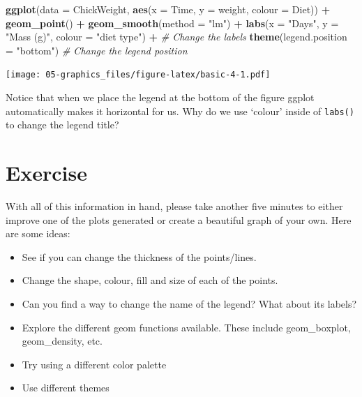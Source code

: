 \documentclass[
]{book}
\newenvironment{Shaded}{\begin{snugshade}}{\end{snugshade}}
\newcommand{\CommentTok}[1]{\textcolor[rgb]{0.56,0.35,0.01}{\textit{#1}}}
\newcommand{\DataTypeTok}[1]{\textcolor[rgb]{0.13,0.29,0.53}{#1}}
\newcommand{\KeywordTok}[1]{\textcolor[rgb]{0.13,0.29,0.53}{\textbf{#1}}}
\newcommand{\NormalTok}[1]{#1}
\newcommand{\OperatorTok}[1]{\textcolor[rgb]{0.81,0.36,0.00}{\textbf{#1}}}
\newcommand{\StringTok}[1]{\textcolor[rgb]{0.31,0.60,0.02}{#1}}
\providecommand{\tightlist}{%
  \setlength{\itemsep}{0pt}\setlength{\parskip}{0pt}}
\begin{document}
\begin{Shaded}
\begin{Highlighting}[]
\KeywordTok{ggplot}\NormalTok{(}\DataTypeTok{data =}\NormalTok{ ChickWeight, }\KeywordTok{aes}\NormalTok{(}\DataTypeTok{x =}\NormalTok{ Time, }\DataTypeTok{y =}\NormalTok{ weight, }\DataTypeTok{colour =}\NormalTok{ Diet)) }\OperatorTok{+}
\StringTok{  }\KeywordTok{geom\_point}\NormalTok{() }\OperatorTok{+}
\StringTok{  }\KeywordTok{geom\_smooth}\NormalTok{(}\DataTypeTok{method =} \StringTok{"lm"}\NormalTok{) }\OperatorTok{+}
\StringTok{  }\KeywordTok{labs}\NormalTok{(}\DataTypeTok{x =} \StringTok{"Days"}\NormalTok{, }\DataTypeTok{y =} \StringTok{"Mass (g)"}\NormalTok{, }\DataTypeTok{colour =} \StringTok{"diet type"}\NormalTok{) }\OperatorTok{+}\StringTok{ }\CommentTok{\# Change the labels}
\StringTok{  }\KeywordTok{theme}\NormalTok{(}\DataTypeTok{legend.position =} \StringTok{"bottom"}\NormalTok{) }\CommentTok{\# Change the legend position}
\end{Highlighting}
\end{Shaded}

\texttt{[image: 05-graphics\_files/figure-latex/basic-4-1.pdf]}

Notice that when we place the legend at the bottom of the figure ggplot automatically makes it horizontal for us. Why do we use `colour' inside of \texttt{labs()} to change the legend title?

\hypertarget{exercise-3}{%
\section{Exercise}\label{exercise-3}}

With all of this information in hand, please take another five minutes to either improve one of the plots generated or create a beautiful graph of your own. Here are some ideas:

\begin{itemize}
\tightlist
\item
  See if you can change the thickness of the points/lines.
\item
  Change the shape, colour, fill and size of each of the points.
\item
  Can you find a way to change the name of the legend? What about its labels?
\item
  Explore the different geom functions available. These include geom\_boxplot, geom\_density, etc.
\item
  Try using a different color palette
\item
  Use different themes
\end{itemize}
\end{document}
